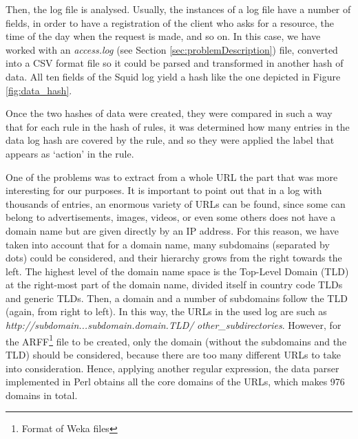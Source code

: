 \documentclass{llncs}
\begin{document}
Then, the log file is analysed. Usually, the instances of a log file have a number of fields, in order to have a registration of the client who asks for a resource, the time of the day when the request is made, and so on. In this case, we have worked with an \textit{access.log} (see Section \ref{sec:problemDescription}) file, converted into a CSV format file so it could be parsed and transformed in another hash of data. All ten fields of the Squid log yield a hash like the one depicted in Figure \ref{fig:data_hash}.

Once the two hashes of data were created, they were compared in such a way that for each rule in the hash of rules, it was determined how many entries in the data log hash are covered by the rule, and so they were applied the label that appears as `action' in the rule.

One of the problems was to extract from a whole URL the part that was more interesting for our purposes. It is important to point out that in a log with thousands of entries, an enormous variety of URLs can be found, since some can belong to advertisements, images, videos, or even some others does not have a domain name but are given directly by an IP address. For this reason, we have taken into account that for a domain name, many subdomains (separated by dots) could be considered, and their hierarchy grows from the right towards the left. The highest level of the domain name space is the Top-Level Domain (TLD) at the right-most part of the domain name, divided itself in country code TLDs and generic TLDs. Then, a domain and a number of subdomains follow the TLD (again, from right to left). In this way, the URLs in the
used log are such as \textit{http://subdomain...subdomain.domain.TLD/} \textit{other\_subdirectories}. However, for the ARFF\footnote{Format of Weka files} file to be created, only the domain (without the subdomains and the TLD) should be considered, because there are too many different URLs to take into consideration. Hence, applying another regular expression, the data parser implemented in Perl obtains all the core domains of the URLs, which makes 976 domains in
total. 
\end{document}
